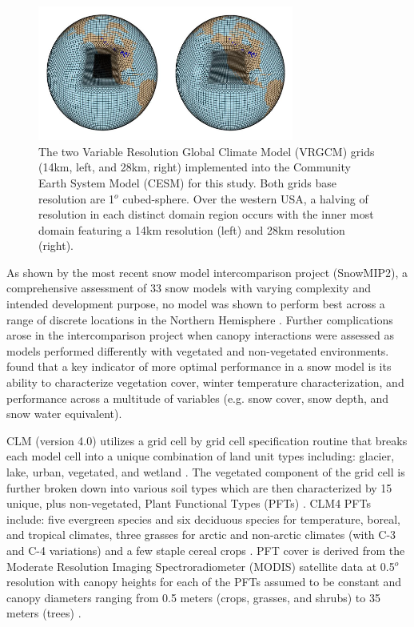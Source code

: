 \documentclass[11pt]{article}
\begin{document}
\begin{figure}
  \begin{center}
  \includegraphics[width=0.75\textwidth]{14kmand28kmgrids}
  \caption{\label{f1}The two Variable Resolution Global Climate Model (VRGCM) grids (14km, left, and 28km, right) implemented into the Community Earth System Model (CESM) for this study.  Both grids base resolution are 1$^{o}$ cubed-sphere.  Over the western USA, a halving of resolution in each distinct domain region occurs with the inner most domain featuring a 14km resolution (left) and 28km resolution (right).}
  \end{center}
\end{figure}

As shown by the most recent snow model intercomparison project (SnowMIP2), a comprehensive assessment of 33 snow models with varying complexity and intended development purpose, no model was shown to perform best across a range of discrete locations in the Northern Hemisphere \citep{rutter2009SnowMIP2}.  Further complications arose in the intercomparison project when canopy interactions were assessed as models performed differently with vegetated and non-vegetated environments.  \citet{rutter2009SnowMIP2} found that a key indicator of more optimal performance in a snow model is its ability to characterize vegetation cover, winter temperature characterization, and performance across a multitude of variables (e.g. snow cover, snow depth, and snow water equivalent).
    
CLM (version 4.0) utilizes a grid cell by grid cell specification routine that breaks each model cell into a unique combination of land unit types including: glacier, lake, urban, vegetated, and wetland \citep{lawrence2011parameterization}.  The vegetated component of the grid cell is further broken down into various soil types which are then characterized by 15 unique, plus non-vegetated, Plant Functional Types (PFTs) \citep{lawrence2011parameterization}. CLM4 PFTs include: five evergreen species and six deciduous species for temperature, boreal, and tropical climates, three grasses for arctic and non-arctic climates (with C-3 and C-4 variations) and a few staple cereal crops \citep{lawrence2011parameterization}.  PFT cover is derived from the Moderate Resolution Imaging Spectroradiometer (MODIS) satellite data at 0.5$^{o}$ resolution with canopy heights for each of the PFTs assumed to be constant and canopy diameters ranging from 0.5 meters (crops, grasses, and shrubs) to 35 meters (trees) \citep{lawrence2011parameterization}.  
\end{document}
